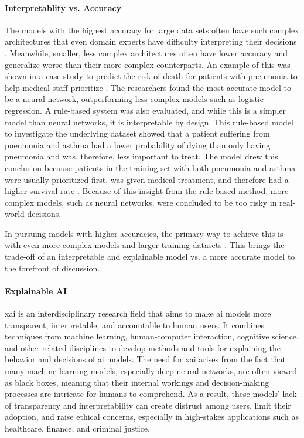\paragraph{Interpretablity vs. Accuracy\\}
The models with the highest accuracy for large data sets often have such complex architectures that even domain experts have difficulty interpreting their decisions \cite{caruanaIntelligibleModelsHealthCare2015}. Meanwhile, smaller, less complex architectures often have lower accuracy and generalize worse than their more complex counterparts. An example of this was shown in a case study to predict the risk of death for patients with pneumonia to help medical staff prioritize \cite{cooperPredictingDireOutcomes2005}. The researchers found the most accurate model to be a neural network, outperforming less complex models such as logistic regression. A rule-based system was also evaluated, and while this is a simpler model than neural networks, it is interpretable by design. This rule-based model to investigate the underlying dataset showed that a patient suffering from pneumonia and asthma had a lower probability of dying than only having pneumonia and was, therefore, less important to treat. The model drew this conclusion because patients in the training set with both pneumonia and asthma were usually prioritized first, was given medical treatment, and therefore had a higher survival rate \cite{cooperEvaluationMachinelearningMethods1997}. Because of this insight from the rule-based method, more complex models, such as neural networks, were concluded to be too risky in real-world decisions.

In pursuing models with higher accuracies, the primary way to achieve this is with even more complex models and larger training datasets \cite{bianchiniComplexityNeuralNetwork2014}. This brings the trade-off of an interpretable and explainable model vs. a more accurate model \cite{barredoarrietaExplainableArtificialIntelligence2020} to the forefront of discussion. 


\paragraph{Explainable AI\\}
\gls{xai} is an interdisciplinary research field that aims to make \gls{ai} models more transparent, interpretable, and accountable to human users. It combines techniques from machine learning, human-computer interaction, cognitive science, and other related disciplines to develop methods and tools for explaining the behavior and decisions of \gls{ai} models. The need for \gls{xai} arises from the fact that many machine learning models, especially deep neural networks, are often viewed as black boxes, meaning that their internal workings and decision-making processes are intricate for humans to comprehend. As a result, these models' lack of transparency and interpretability can create distrust among users, limit their adoption, and raise ethical concerns, especially in high-stakes applications such as healthcare, finance, and criminal justice.

